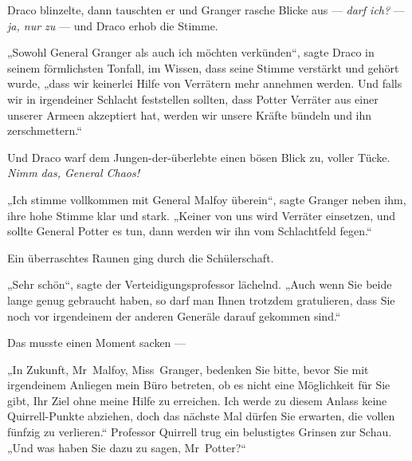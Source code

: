 Draco blinzelte, dann tauschten er und Granger rasche Blicke aus — \emph{darf ich?} — \emph{ja, nur zu} — und Draco erhob die Stimme.

„Sowohl General Granger als auch ich möchten verkünden“, sagte Draco in seinem förmlichsten Tonfall, im Wissen, dass seine Stimme verstärkt und gehört wurde, „dass wir keinerlei Hilfe von Verrätern mehr annehmen werden. Und falls wir in irgendeiner Schlacht feststellen sollten, dass Potter Verräter aus einer unserer Armeen akzeptiert hat, werden wir unsere Kräfte bündeln und ihn zerschmettern.“

Und Draco warf dem Jungen-der-überlebte einen bösen Blick zu, voller Tücke. \emph{Nimm das, General Chaos!}

„Ich stimme vollkommen mit General Malfoy überein“, sagte Granger neben ihm, ihre hohe Stimme klar und stark.
„Keiner von uns wird Verräter einsetzen, und sollte General Potter es tun, dann werden wir ihn vom Schlachtfeld fegen.“

Ein überraschtes Raunen ging durch die Schülerschaft.

„Sehr schön“, sagte der Verteidigungsprofessor lächelnd.
„Auch wenn Sie beide lange genug gebraucht haben, so darf man Ihnen trotzdem gratulieren, dass Sie noch vor irgendeinem der anderen Generäle darauf gekommen sind.“

Das musste einen Moment sacken —

„In Zukunft, Mr~Malfoy, Miss~Granger, bedenken Sie bitte, bevor Sie mit irgendeinem Anliegen mein Büro betreten, ob es nicht eine Möglichkeit für Sie gibt, Ihr Ziel ohne meine Hilfe zu erreichen. Ich werde zu diesem Anlass keine Quirrell-Punkte abziehen, doch das nächste Mal dürfen Sie erwarten, die vollen fünfzig zu verlieren.“ Professor Quirrell trug ein belustigtes Grinsen zur Schau.
„Und was haben Sie dazu zu sagen, Mr~Potter?“

